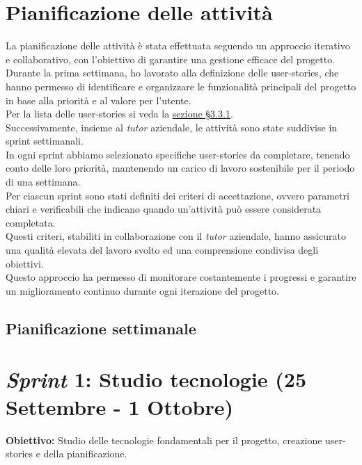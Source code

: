 \section{Pianificazione delle attività}
\label{sez:pianificazione-attivita}

La pianificazione delle attività è stata effettuata seguendo un approccio iterativo e collaborativo, con l'obiettivo di garantire una gestione efficace del progetto.\\
Durante la prima settimana, ho lavorato alla definizione delle \gls{user-stories}, che hanno permesso di identificare e organizzare le funzionalità principali del progetto in base alla priorità e al valore per l’utente.\\
Per la lista delle \gls{user-stories} si veda la {\hyperref[subsubsec:epic-stories]{sezione §3.3.1}}.\\

\noindent Successivamente, insieme al \textit{tutor} aziendale, le attività sono state suddivise in \gls{sprint} settimanali.\\
In ogni \gls{sprint} abbiamo selezionato specifiche \gls{user-stories} da completare, tenendo conto delle loro priorità, mantenendo un carico di lavoro sostenibile per il periodo di una settimana. \\
Per ciascun \gls{sprint} sono stati definiti dei criteri di accettazione, ovvero parametri chiari e verificabili che indicano quando un'attività può essere considerata completata. \\
Questi criteri, stabiliti in collaborazione con il \textit{tutor} aziendale, hanno assicurato una qualità elevata del lavoro svolto ed una comprensione condivisa degli obiettivi. \\
Questo approccio ha permesso di monitorare costantemente i progressi e garantire un miglioramento continuo durante ogni iterazione del progetto.


\pagebreak
\subsection{Pianificazione settimanale}
\label{sez:pianificazione-settimanale}

\section*{\textit{Sprint} 1: Studio tecnologie (25 Settembre - 1 Ottobre)}
\textbf{Obiettivo:} Studio delle tecnologie fondamentali per il progetto, creazione \gls{user-stories} e della pianificazione.\\  

